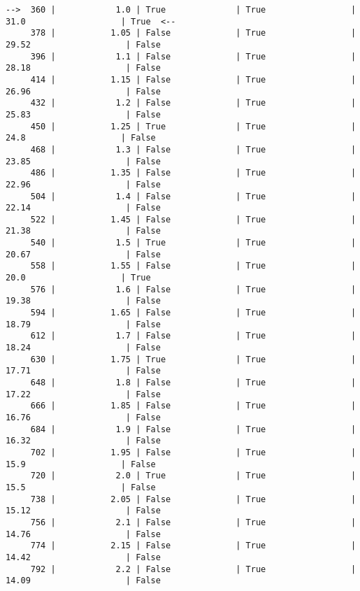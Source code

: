 \documentclass{article}
\begin{document}
\begin{Verbatim}[commandchars=\\\{\}]
-->  360 |            1.0 | True              | True                 |    31.0                   | True  <--
     378 |           1.05 | False             | True                 |   29.52                   | False
     396 |            1.1 | False             | True                 |   28.18                   | False
     414 |           1.15 | False             | True                 |   26.96                   | False
     432 |            1.2 | False             | True                 |   25.83                   | False
     450 |           1.25 | True              | True                 |    24.8                   | False
     468 |            1.3 | False             | True                 |   23.85                   | False
     486 |           1.35 | False             | True                 |   22.96                   | False
     504 |            1.4 | False             | True                 |   22.14                   | False
     522 |           1.45 | False             | True                 |   21.38                   | False
     540 |            1.5 | True              | True                 |   20.67                   | False
     558 |           1.55 | False             | True                 |    20.0                   | True
     576 |            1.6 | False             | True                 |   19.38                   | False
     594 |           1.65 | False             | True                 |   18.79                   | False
     612 |            1.7 | False             | True                 |   18.24                   | False
     630 |           1.75 | True              | True                 |   17.71                   | False
     648 |            1.8 | False             | True                 |   17.22                   | False
     666 |           1.85 | False             | True                 |   16.76                   | False
     684 |            1.9 | False             | True                 |   16.32                   | False
     702 |           1.95 | False             | True                 |    15.9                   | False
     720 |            2.0 | True              | True                 |    15.5                   | False
     738 |           2.05 | False             | True                 |   15.12                   | False
     756 |            2.1 | False             | True                 |   14.76                   | False
     774 |           2.15 | False             | True                 |   14.42                   | False
     792 |            2.2 | False             | True                 |   14.09                   | False

\end{Verbatim}
\end{document}
